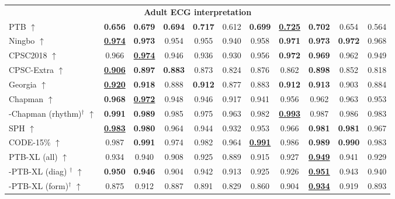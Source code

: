 \documentclass{article}
\begin{document}
\begin{table}[t]
\begin{tabular}{lcccccccccc}
                    \multicolumn{11}{c}{\textbf{Adult ECG interpretation }} \\
                    PTB $\uparrow$ & \textbf{0.656} & \textbf{0.679} & \textbf{0.694} & \textbf{0.717} & 0.612 & \textbf{0.699} & \underline{\textbf{0.725}} & \textbf{0.702} & 0.654 & 0.564 \\
                    Ningbo  $\uparrow$ & \underline{\textbf{0.974}} & \textbf{0.973} & 0.954 & 0.955 & 0.940 & 0.958 & \textbf{0.971} & \textbf{0.973} & \textbf{0.972} & 0.968 \\
                    CPSC2018 $\uparrow$ & 0.966 & \underline{\textbf{0.974}} & 0.946 & 0.936 & 0.930 & 0.956 & \textbf{0.972} & \textbf{0.969} & 0.962 & 0.949 \\
                    CPSC-Extra $\uparrow$ & \underline{\textbf{0.906}} & \textbf{0.897} & \textbf{0.883} & 0.873 & 0.824 & 0.876 & 0.862 & \textbf{0.898} & 0.852 & 0.818 \\
                    Georgia $\uparrow$ & \underline{\textbf{0.920}} & \textbf{0.918} & 0.888 & \textbf{0.912} & 0.877 & 0.883 & \textbf{0.912} & \textbf{0.913} & 0.903 & 0.884 \\
                    Chapman $\uparrow$ & \textbf{0.968} & \underline{\textbf{0.972}} & 0.948 & 0.946 & 0.917 & 0.941 & 0.956 & 0.962 & 0.963 & 0.953 \\
                    -Chapman (rhythm)${}^\dagger$ $\uparrow$ & \textbf{0.991} & \textbf{0.989} & 0.985 & 0.975 & 0.963 & 0.982 & \underline{\textbf{0.993}} & 0.987 & 0.986 & 0.983 \\
                    SPH $\uparrow$ & \underline{\textbf{0.983}} & \textbf{0.980} & 0.964 & 0.944 & 0.932 & 0.953 & 0.966 & \textbf{0.981} & \textbf{0.981} & 0.967 \\
                    CODE-15\% $\uparrow$ & 0.987 & \textbf{0.991} & 0.974 & 0.982 & 0.964 & \underline{\textbf{0.991}} & 0.986 & \textbf{0.989} & \textbf{0.990} & 0.983 \\
                    PTB-XL (all) $\uparrow$ & 0.934 & 0.940 & 0.908 & 0.925 & 0.889 & 0.915 & 0.927 & \underline{\textbf{0.949}} & 0.941 & 0.929 \\
                    -PTB-XL (diag) ${}^\dagger$ $\uparrow$ & \textbf{0.950} & \textbf{0.946} & 0.904 & 0.942 & 0.913 & 0.925 & 0.926 & \underline{\textbf{0.951}} & 0.943 & 0.940 \\
                    -PTB-XL (form)${}^\dagger$ $\uparrow$ & 0.875 & 0.912 & 0.887 & 0.891 & 0.829 & 0.860 & 0.904 & \underline{\textbf{0.934}} & 0.919 & 0.893 \\

\end{tabular}
\end{table}
\end{document}
